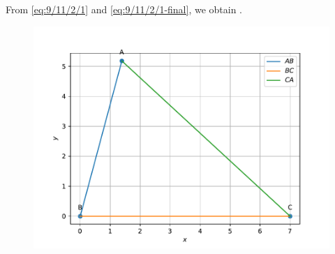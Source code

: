 		From 
		\eqref{eq:9/11/2/1}
		and 
		\eqref{eq:9/11/2/1-final},
		we obtain
		.

	\begin{figure}[!h]
		\centering
 \includegraphics[width=\columnwidth]{chapters/9/11/2/1/figs/vector.pdf}
		\caption{}
		\label{fig:9/11/2/1}
  	\end{figure}
	
